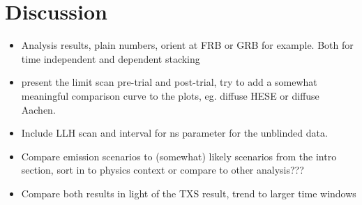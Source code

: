 \chapter{Discussion}

\begin{itemize}
  \item Analysis results, plain numbers, orient at FRB or GRB for example.
  Both for time independent and dependent stacking
  \item present the limit scan pre-trial and post-trial, try to add a somewhat meaningful comparison curve to the plots, eg. diffuse HESE or diffuse Aachen.
  \item Include LLH scan and interval for ns parameter for the unblinded data.
  \item Compare emission scenarios to (somewhat) likely scenarios from the intro section, sort in to physics context or compare to other analysis???
  \item Compare both results in light of the TXS result, trend to larger time windows
\end{itemize}


